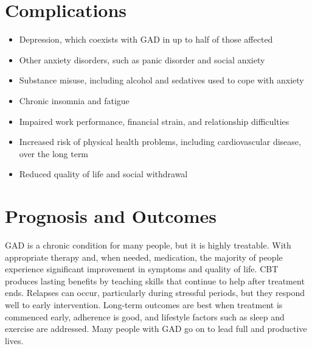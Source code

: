\section*{Complications}
\begin{itemize}
    \item Depression, which coexists with GAD in up to half of those affected
    \item Other anxiety disorders, such as panic disorder and social anxiety
    \item Substance misuse, including alcohol and sedatives used to cope with anxiety
    \item Chronic insomnia and fatigue
    \item Impaired work performance, financial strain, and relationship difficulties
    \item Increased risk of physical health problems, including cardiovascular disease, over the long term
    \item Reduced quality of life and social withdrawal
\end{itemize}

\section*{Prognosis and Outcomes}
GAD is a chronic condition for many people, but it is highly treatable. With appropriate therapy and, when needed, medication, the majority of people experience significant improvement in symptoms and quality of life. CBT produces lasting benefits by teaching skills that continue to help after treatment ends. Relapses can occur, particularly during stressful periods, but they respond well to early intervention. Long-term outcomes are best when treatment is commenced early, adherence is good, and lifestyle factors such as sleep and exercise are addressed. Many people with GAD go on to lead full and productive lives.

